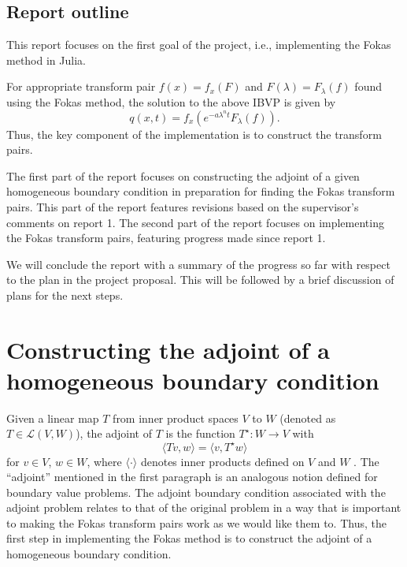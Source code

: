 \documentclass[11pt, oneside, a4paper]{article}
\begin{document}
\subsection{Report outline}
This report focuses on the first goal of the project, i.e., implementing the Fokas method in Julia.

For appropriate transform pair $f(x)=f_x(F)$ and $F(\lambda)=F_\lambda(f)$ found using the Fokas method, the solution to the above IBVP is given by\cite[p.15]{Smith2016}
\[q(x,t) = f_x(e^{-a\lambda^n t}F_\lambda(f)).\]
Thus, the key component of the implementation is to construct the transform pairs.

The first part of the report focuses on constructing the adjoint of a given homogeneous boundary condition in preparation for finding the Fokas transform pairs. This part of the report features revisions based on the supervisor's comments on report 1. The second part of the report focuses on implementing the Fokas transform pairs, featuring progress made since report 1.

We will conclude the report with a summary of the progress so far with respect to the plan in the project proposal. This will be followed by a brief discussion of plans for the next steps.

\section{Constructing the adjoint of a homogeneous boundary condition}
Given a linear map $T$ from inner product spaces $V$ to $W$ (denoted as $T\in\mathcal{L}(V,W)$), the adjoint of $T$ is the function $T^\star:W\to V$ with
\begin{equation}\label{eq:linear map adjoint}
    \langle Tv, w\rangle = \langle v, T^\star w\rangle
\end{equation}
for $v\in V$, $w\in W$, where $\langle \cdot \rangle$ denotes inner products defined on $V$ and $W$ \cite[p.204]{Axler1997}. The ``adjoint'' mentioned in the first paragraph is an analogous notion defined for boundary value problems. The adjoint boundary condition associated with the adjoint problem relates to that of the original problem in a way that is important to making the Fokas transform pairs work as we would like them to. Thus, the first step in implementing the Fokas method is to construct the adjoint of a homogeneous boundary condition.
\end{document}
